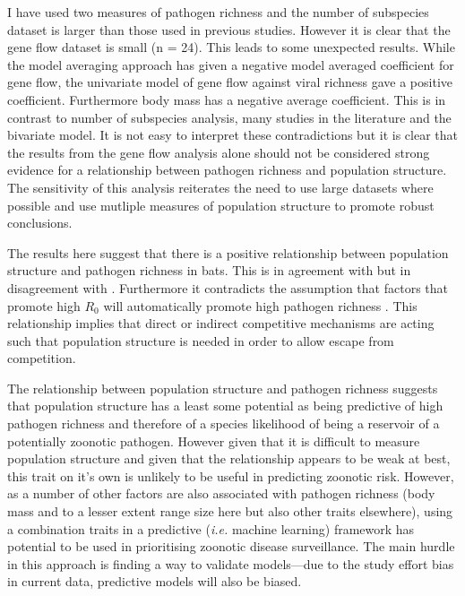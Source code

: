I have used two measures of pathogen richness and the number of subspecies dataset is larger than those used in previous studies.
However it is clear that the gene flow dataset is small (n = 24).
This leads to some unexpected results.
While the model averaging approach has given a negative model averaged coefficient for gene flow, the univariate model of gene flow against viral richness gave a positive coefficient.
Furthermore body mass has a negative average coefficient.
This is in contrast to number of subspecies analysis, many studies in the literature \cite{kamiya2014determines, turmelle2009correlates, gay2014parasite, maganga2014bat} and the bivariate model.
It is not easy to interpret these contradictions but it is clear that the results from the gene flow analysis alone should not be considered strong evidence for a relationship between pathogen richness and population structure.
The sensitivity of this analysis reiterates the need to use large datasets where possible and use mutliple measures of population structure to promote robust conclusions.


The results here suggest that there is a positive relationship between population structure and pathogen richness in bats.
This is in agreement with \cite{maganga2014bat, turmelle2009correlates} but in disagreement with \cite{gay2014parasite}.
Furthermore it contradicts the assumption that factors that promote high $R_0$ will automatically promote high pathogen richness \cite{nunn2003comparative, morand2000wormy}.
This relationship implies that direct or indirect competitive mechanisms are acting such that population structure is needed in order to allow escape from competition.

The relationship between population structure and pathogen richness suggests that population structure has a least some potential as being predictive of high pathogen richness and therefore of a species likelihood of being a reservoir of a potentially zoonotic pathogen. 
However given that it is difficult to measure population structure and given that the relationship appears to be weak at best, this trait on it's own is unlikely to be useful in predicting zoonotic risk.
However, as a number of other factors are also associated with pathogen richness (body mass and to a lesser extent range size here but also other traits elsewhere), using a combination traits in a predictive (\emph{i.e.} machine learning) framework has potential to be used in prioritising zoonotic disease surveillance.
The main hurdle in this approach is finding a way to validate models---due to the study effort bias in current data, predictive models will also be biased.

